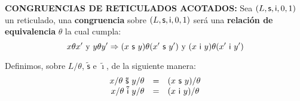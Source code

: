   \vspace{3mm}
  \PN \textbf{CONGRUENCIAS DE RETICULADOS ACOTADOS:} Sea $(L, \mathsf{s}, \mathsf{i}, 0, 1)$ un reticulado, una \textbf{congruencia}
  sobre $(L, \mathsf{s}, \mathsf{i}, 0, 1)$ será una \textbf{relación de equivalencia} $\theta$ la cual cumpla:
  \[
    x \theta x^{\prime} \text{ y } y \theta y^{\prime} \Rightarrow (x \ \SU \ y) \theta (x^{\prime} \ \SU \ y^{\prime})
    \text{ y } (x \ \IN \ y) \theta (x^{\prime} \ \IN \ y^{\prime})
  \]

  \PN Definimos, sobre $L/\theta$, $\mathsf{\tilde{s}}$ e $\mathsf{\tilde{\imath}}$, de la siguiente manera:
  \[
    \begin{array}{rcl}
      x/\theta \ \mathsf{\tilde{s}} \ y/\theta &=& (x \ \SU \ y)/\theta \\
      x/\theta \ \mathsf{\tilde{i}} \ y/\theta &=& (x \ \IN \ y)/\theta
    \end{array}
  \]
